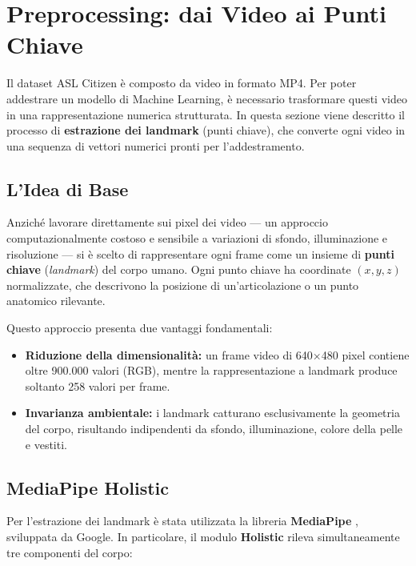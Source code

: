 
\section{Preprocessing: dai Video ai Punti Chiave}

Il dataset ASL Citizen è composto da video in formato MP4. Per poter addestrare un modello di Machine Learning, è necessario trasformare questi video in una rappresentazione numerica strutturata. In questa sezione viene descritto il processo di \textbf{estrazione dei landmark} (punti chiave), che converte ogni video in una sequenza di vettori numerici pronti per l'addestramento.

\subsection{L'Idea di Base}

Anziché lavorare direttamente sui pixel dei video --- un approccio computazionalmente costoso e sensibile a variazioni di sfondo, illuminazione e risoluzione --- si è scelto di rappresentare ogni frame come un insieme di \textbf{punti chiave} (\textit{landmark}) del corpo umano. Ogni punto chiave ha coordinate $(x, y, z)$ normalizzate, che descrivono la posizione di un'articolazione o un punto anatomico rilevante.

Questo approccio presenta due vantaggi fondamentali:
\begin{itemize}
    \item \textbf{Riduzione della dimensionalità:} un frame video di 640$\times$480 pixel contiene oltre 900.000 valori (RGB), mentre la rappresentazione a landmark produce soltanto 258 valori per frame.
    \item \textbf{Invarianza ambientale:} i landmark catturano esclusivamente la geometria del corpo, risultando indipendenti da sfondo, illuminazione, colore della pelle e vestiti.
\end{itemize}

\subsection{MediaPipe Holistic}

Per l'estrazione dei landmark è stata utilizzata la libreria \textbf{MediaPipe} \cite{mediapipe2020}, sviluppata da Google. In particolare, il modulo \textbf{Holistic} rileva simultaneamente tre componenti del corpo:

